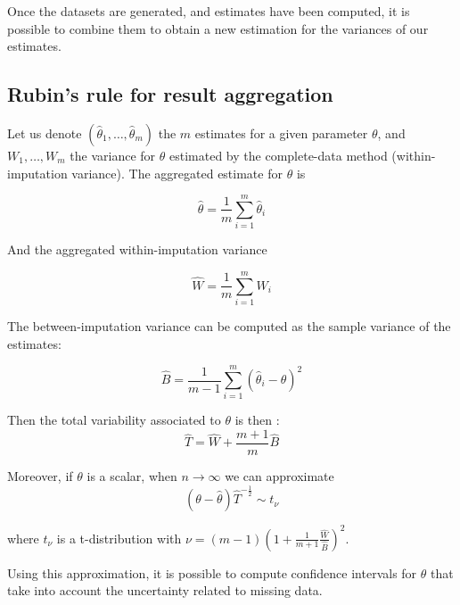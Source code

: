 Once the datasets are generated, and estimates have been computed, it is possible to combine them to obtain a new estimation for the variances of our estimates\cite[Ch.\ 5]{Rubin_missdata}.

		\subsection{Rubin's rule for result aggregation}

Let us denote $(\hat{\theta}_1, \ldots, \hat{\theta}_m)$ the $m$ estimates for a given parameter $\theta$, and $W_1, \ldots, W_m$ the variance for $\theta$ estimated by the complete-data method (within-imputation variance). The aggregated estimate for $\theta$ is

$$\hat{\theta} = \frac{1}{m} \sum\limits_{i=1}^m \hat{\theta}_i $$

And the aggregated within-imputation variance 

$$ \hat{W} = \frac{1}{m} \sum\limits_{i=1}^m W_i $$

The between-imputation variance can be computed as the sample variance of the estimates:

$$\hat{B} = \frac{1}{m-1} \sum\limits_{i=1}^m (\hat{\theta}_i - \hat{\theta})^2$$

Then the total variability associated to $\theta$ is then \cite[Ch.\ 5]{Rubin_missdata}:
$$\hat{T} = \hat{W} + \frac{m+1}{m} \hat{B}$$

Moreover, if $\theta$ is a scalar, when $n \rightarrow \infty$ we can approximate \cite{rubin1986mi_founding}
$$ (\theta - \hat{\theta})\hat{T}^{-\frac{1}{2}} \sim t_\nu$$

where $t_\nu$ is a t-distribution with $\nu = (m-1)(1+\frac{1}{m+1}\frac{\hat{W}}{\hat{B}})^2$. 

Using this approximation, it is possible to compute confidence intervals for $\theta$ that take into account the uncertainty related to missing data.
